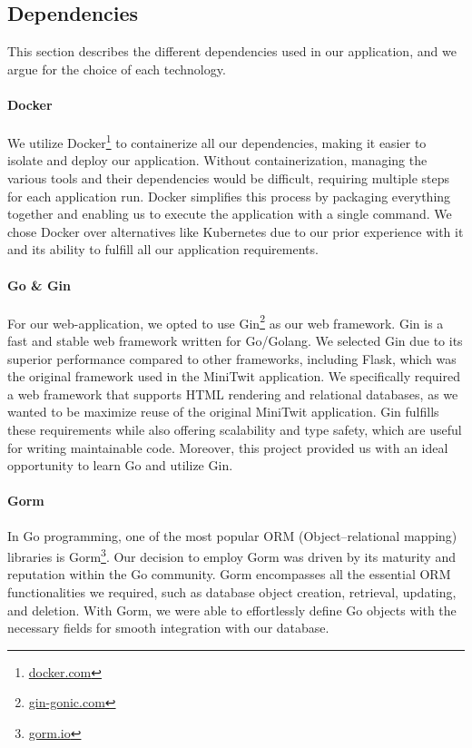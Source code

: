 \subsection{Dependencies} \label{sec:dependencies}
This section describes the different dependencies used in our application, and we argue for the choice of each technology.

\paragraph*{Docker}
We utilize Docker\footnote{\href{https://www.docker.com/}{docker.com}} to containerize all our dependencies, making it easier to isolate and deploy our application. Without containerization, managing the various tools and their dependencies would be difficult, requiring multiple steps for each application run. Docker simplifies this process by packaging everything together and enabling us to execute the application with a single command. We chose Docker over alternatives like Kubernetes due to our prior experience with it and its ability to fulfill all our application requirements.

\paragraph*{Go \& Gin}
For our web-application, we opted to use Gin\footnote{\href{https://gin-gonic.com/}{gin-gonic.com}} as our web framework. Gin is a fast and stable web framework written for Go/Golang. We selected Gin due to its superior performance compared to other frameworks, including Flask, which was the original framework used in the MiniTwit application. We specifically required a web framework that supports HTML rendering and relational databases, as we wanted to be maximize reuse of the original MiniTwit application. Gin fulfills these requirements while also offering scalability and type safety, which are useful for writing maintainable code. Moreover, this project provided us with an ideal opportunity to learn Go and utilize Gin.

\paragraph*{Gorm}
In Go programming, one of the most popular ORM (Object–relational mapping) libraries is Gorm\footnote{\href{https://gorm.io/}{gorm.io}}. Our decision to employ Gorm was driven by its maturity and reputation within the Go community. Gorm encompasses all the essential ORM functionalities we required, such as database object creation, retrieval, updating, and deletion. With Gorm, we were able to effortlessly define Go objects with the necessary fields for smooth integration with our database.


